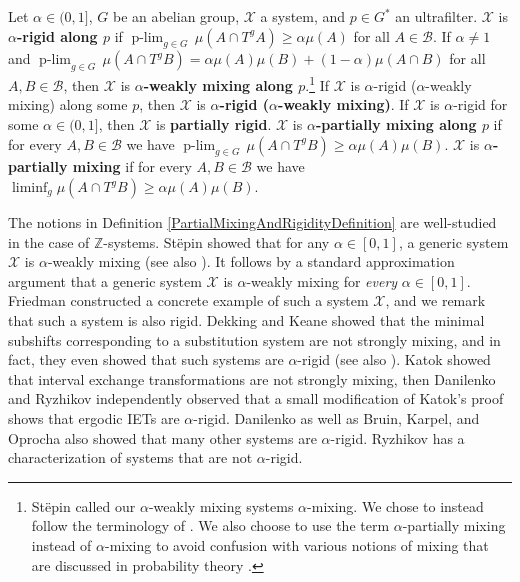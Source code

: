 \documentclass[graybox]{svmult}
\theoremstyle{definition}
\newcommand{\plimgG}[3]{\mathop {#1\text{-lim}}_{#2\in #3}\,}
\begin{document}
\begin{definition}\label{PartialMixingAndRigidityDefinition}
Let $\alpha \in (0,1]$, $G$ be an abelian group, $\mathcal{X}$ a system, and $p \in G^*$ an ultrafilter.
$\mathcal{X}$ is \textbf{$\alpha$-rigid along $p$} if $\plimgG{p}{g}{G}\mu(A\cap T^gA) \ge \alpha\mu(A)$ for all $A \in \mathscr{B}$.
If $\alpha \neq 1$ and $\plimgG{p}{g}{G}\mu(A\cap T^gB) = \alpha\mu(A)\mu(B)+(1-\alpha)\mu(A\cap B)$ for all $A,B \in \mathscr{B}$, then $\mathcal{X}$ is \textbf{$\alpha$-weakly mixing along $p$}.\footnote{St{\"e}pin \cite{PartiallyRigidAndMixingIsGeneric} called our $\alpha$-weakly mixing systems $\alpha$-mixing. 
We chose to instead follow the terminology of \cite{ErgodicTheoryViaJoinings}. We also choose to use the term $\alpha$-partially mixing instead of $\alpha$-mixing to avoid confusion with various notions of mixing that are discussed in probability theory \cite{MixingInProbabilitySurvey}.}
If $\mathcal{X}$ is $\alpha$-rigid ($\alpha$-weakly mixing) along some $p$, then $\mathcal{X}$ is \textbf{$\alpha$-rigid ($\alpha$-weakly mixing)}.
If $\mathcal{X}$ is $\alpha$-rigid for some $\alpha \in (0,1]$, then $\mathcal{X}$ is \textbf{partially rigid}.
$\mathcal{X}$ is \textbf{$\alpha$-partially mixing along $p$} if for every $A,B \in \mathscr{B}$ we have $\plimgG{p}{g}{G}\mu(A\cap T^gB) \ge \alpha\mu(A)\mu(B)$.
$\mathcal{X}$ is \textbf{$\alpha$-partially mixing} if for every $A,B \in \mathscr{B}$ we have $\liminf_g\mu(A\cap T^gB) \ge \alpha\mu(A)\mu(B)$.
\end{definition}

The notions in Definition \ref{PartialMixingAndRigidityDefinition} are well-studied in the case of $\mathbb{Z}$-systems.
St{\"e}pin \cite{PartiallyRigidAndMixingIsGeneric} showed that for any $\alpha \in [0,1]$, a generic system $\mathcal{X}$ is $\alpha$-weakly mixing (see also \cite{GenericSpectralProperties,MixingAndRigidRigo,zelada2025coexistence}). It follows by a standard approximation argument that a generic system $\mathcal{X}$ is $\alpha$-weakly mixing for \textit{every} $\alpha\in [0,1]$.
Friedman \cite{PartialMixingAndPartialRigidity} constructed a concrete example of such a system $\mathcal{X}$, and we remark that such a system is also rigid.
Dekking and Keane \cite{SubstitutionsAreNotMixing} showed that the minimal subshifts corresponding to a substitution system are not strongly mixing, and in fact, they even showed that such systems are $\alpha$-rigid (see also \cite{RateOfRigidtyForSubstitutions}).
Katok \cite{IETsAreNotMixing} showed that interval exchange transformations are not strongly mixing, then Danilenko \cite{DanilenkoPartiallyRigid} and Ryzhikov \cite{RyzhikovAbsenceOfMixing} independently observed that a small modification of Katok's proof shows that ergodic IETs are $\alpha$-rigid.
Danilenko \cite{DanilenkoPartiallyRigid} as well as Bruin, Karpel, and Oprocha \cite{RigidtyAndToeplitzSystems} also showed that many other systems are $\alpha$-rigid.
Ryzhikov \cite{NotPartiallyRigidCharacterization} has a characterization of systems that are not $\alpha$-rigid.
\end{document}
